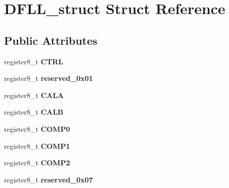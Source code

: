 \hypertarget{struct_d_f_l_l__struct}{}\section{D\+F\+L\+L\+\_\+struct Struct Reference}
\label{struct_d_f_l_l__struct}
\subsection*{Public Attributes}
\begin{DoxyCompactItemize}
\item 
register8\+\_\+t {\bfseries C\+T\+RL}\hypertarget{struct_d_f_l_l__struct_af2e5686437264ad16c39ffa2d3ed46e0}{}\label{struct_d_f_l_l__struct_af2e5686437264ad16c39ffa2d3ed46e0}

\item 
register8\+\_\+t {\bfseries reserved\+\_\+0x01}\hypertarget{struct_d_f_l_l__struct_a3eb4a54008db96917e095a177c94eb1d}{}\label{struct_d_f_l_l__struct_a3eb4a54008db96917e095a177c94eb1d}

\item 
register8\+\_\+t {\bfseries C\+A\+LA}\hypertarget{struct_d_f_l_l__struct_ae3b0088249723a12f6b94f12f27da2bf}{}\label{struct_d_f_l_l__struct_ae3b0088249723a12f6b94f12f27da2bf}

\item 
register8\+\_\+t {\bfseries C\+A\+LB}\hypertarget{struct_d_f_l_l__struct_a3b301c9e72d1a898cf43de28c05c4924}{}\label{struct_d_f_l_l__struct_a3b301c9e72d1a898cf43de28c05c4924}

\item 
register8\+\_\+t {\bfseries C\+O\+M\+P0}\hypertarget{struct_d_f_l_l__struct_a204664b2ce7db1102501ac95ef627c20}{}\label{struct_d_f_l_l__struct_a204664b2ce7db1102501ac95ef627c20}

\item 
register8\+\_\+t {\bfseries C\+O\+M\+P1}\hypertarget{struct_d_f_l_l__struct_a36cead723e87ed911a4694174cbdaf8d}{}\label{struct_d_f_l_l__struct_a36cead723e87ed911a4694174cbdaf8d}

\item 
register8\+\_\+t {\bfseries C\+O\+M\+P2}\hypertarget{struct_d_f_l_l__struct_adca6783bcb9f4ffeb729efba3a6b0213}{}\label{struct_d_f_l_l__struct_adca6783bcb9f4ffeb729efba3a6b0213}

\item 
register8\+\_\+t {\bfseries reserved\+\_\+0x07}\hypertarget{struct_d_f_l_l__struct_afb05d17c581ed91bc7755b03fa4d722a}{}\label{struct_d_f_l_l__struct_afb05d17c581ed91bc7755b03fa4d722a}

\end{DoxyCompactItemize}


